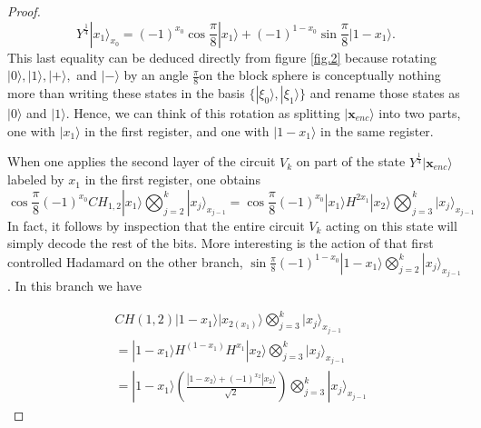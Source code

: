 \documentclass{article}
\theoremstyle{definition}
\newcommand{\ket}[1]{|#1\rangle}
\begin{document}
\begin{proof}
\[Y^\frac{1}{4}\ket{x_1}_{x_{0}}=(-1)^{x_0}\cos\frac{\pi}{8}\ket{x_1}+(-1)^{1-x_0}\sin\frac{\pi}{8}\ket{1-x_1}.\]
This last equality can be deduced directly from figure \ref{fig.2} because rotating $\ket{0}, \ket{1}, \ket{+},$ and $\ket{-}$ by an angle $\frac{\pi}{8}$on the block sphere is conceptually nothing more than writing these states in the basis $\{\ket{\xi_0}, \ket{\xi_1}\}$ and rename those states as $\ket{0}$ and $\ket{1}$. Hence, we can think of this rotation as splitting $\ket{\textbf{x}_{enc}}$ into two parts, one with $\ket{x_1}$ in the first register, and one with $\ket{1-x_1}$ in the same register.
\begin{figure}
\centering
{}
\label{fig:bases}
\end{figure}
When one applies the second layer of the circuit $V_k$ on part of the state $Y^{\frac{1}{4}}\ket{\textbf{x}_{enc}}$ labeled by $x_1$ in the first register, one obtains 
\[\cos\frac{\pi}{8}(-1)^{x_0}CH_{1,2}\ket{x_1}\bigotimes_{j=2}^k\ket{x_j}_{x_{j-1}}=\cos\frac{\pi}{8}(-1)^{x_0}\ket{x_1}H^{2 x_1}\ket{x_2}\bigotimes_{j=3}^k\ket{x_j}_{x_{j-1}}\]
In fact, it follows by inspection that the entire circuit $V_k$ acting on this state will simply decode the rest of the bits. More interesting is the action of that first controlled Hadamard on the other branch, $\sin\frac{\pi}{8}(-1)^{1-x_0}\ket{1-x_1}\bigotimes_{j=2}^k\ket{x_j}_{x_{j-1}}$. In this branch we have

\begin{eqnarray}
&CH(1,2)\ket{1-x_1}\ket{x_{2(x_1)}}\bigotimes_{j=3}^k\ket{x_j}_{x_{j-1}}\\
&=\ket{1-x_1}H^{(1-x_1)}H^{x_1}\ket{x_2}\bigotimes_{j=3}^k\ket{x_j}_{x_{j-1}}\\
&=\ket{1-x_1}\left(\frac{\ket{1-x_2}+(-1)^{x_2}\ket{x_2}}{\sqrt2}\right)\bigotimes_{j=3}^k\ket{x_j}_{x_{j-1}}
\end{eqnarray}


\end{proof}
\end{document}
